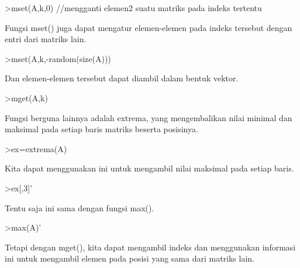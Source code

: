 \documentclass[a4paper,10pt]{article}
\begin{document}
\begin{eulernotebook}
\begin{euleroutput}
\end{euleroutput}
\begin{eulerprompt}
>mset(A,k,0) //mengganti elemen2 suatu matriks pada indeks tertentu
\end{eulerprompt}
\begin{euleroutput}
  
  Fungsi mset() juga dapat mengatur elemen-elemen pada indeks tersebut dengan entri dari matriks lain.
  
\end{euleroutput}
\begin{eulerprompt}
>mset(A,k,-random(size(A)))
\end{eulerprompt}
\begin{euleroutput}
  
  Dan elemen-elemen tersebut dapat diambil dalam bentuk vektor.
  
\end{euleroutput}
\begin{eulerprompt}
>mget(A,k)
\end{eulerprompt}
\begin{euleroutput}
  
  Fungsi berguna lainnya adalah extrema, yang mengembalikan nilai minimal dan maksimal pada setiap baris matriks beserta posisinya.
  
\end{euleroutput}
\begin{eulerprompt}
>ex=extrema(A)
\end{eulerprompt}
\begin{euleroutput}
  
  Kita dapat menggunakan ini untuk mengambil nilai maksimal pada setiap baris.
  
\end{euleroutput}
\begin{eulerprompt}
>ex[,3]'
\end{eulerprompt}
\begin{euleroutput}
  
  Tentu saja ini sama dengan fungsi max().
  
\end{euleroutput}
\begin{eulerprompt}
>max(A)'
\end{eulerprompt}
\begin{euleroutput}
  
  Tetapi dengan mget(), kita dapat mengambil indeks dan menggunakan informasi ini untuk mengambil elemen pada posisi yang sama dari matriks lain.
  

\end{euleroutput}
\end{eulernotebook}
\end{document}
